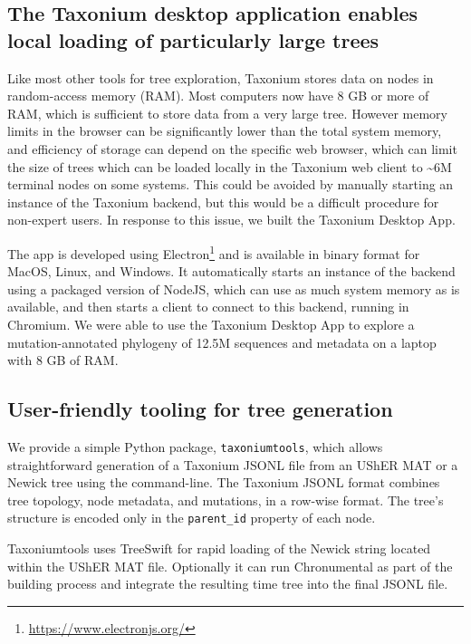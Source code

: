 \subsection*{The Taxonium desktop application enables local loading of particularly large trees}

Like most other tools for tree exploration, Taxonium stores data on nodes in random-access memory (RAM). Most computers now have 8 GB or more of RAM, which is sufficient to store data from a very large tree. However memory limits in the browser can be significantly lower than the total system memory, and efficiency of storage can depend on the specific web browser, which can limit the size of trees which can be loaded locally in the Taxonium web client to \textasciitilde{}6M terminal nodes on some systems. This could be avoided by manually starting an instance of the Taxonium backend, but this would be a difficult procedure for non-expert users. In response to this issue, we built the Taxonium Desktop App.

The app is developed using Electron\footnote{\url{https://www.electronjs.org/}} and is available in binary format for MacOS, Linux, and Windows. It automatically starts an instance of the backend using a packaged version of NodeJS, 
which can use as much system memory as is available, and then starts a client to connect to this backend, running in Chromium. We were able to use the Taxonium Desktop App to explore a mutation-annotated phylogeny of 12.5M sequences and metadata on a laptop with 8 GB of RAM.



\subsection*{User-friendly tooling for tree generation}

We provide a simple Python package, \texttt{taxoniumtools}, which allows straightforward generation of a Taxonium JSONL file from an UShER MAT or a Newick tree using the command-line. The Taxonium JSONL format combines tree topology, node metadata, and mutations, in a row-wise format. The tree's structure is encoded only in the \texttt{parent\_id} property of each node.

Taxoniumtools uses TreeSwift \citep{moshiri2020treeswift} for rapid loading of the Newick string located within the UShER MAT file. Optionally it can run Chronumental \citep{chronumental} as part of the building process and integrate the resulting time tree into the final JSONL file.

